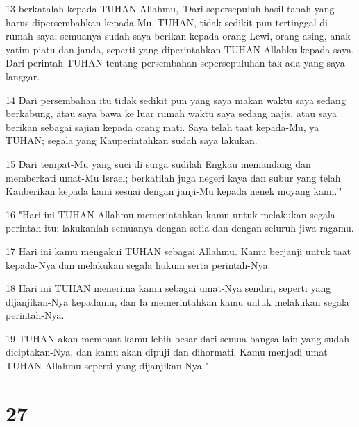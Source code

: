 \par 13 berkatalah kepada TUHAN Allahmu, 'Dari sepersepuluh hasil tanah yang harus dipersembahkan kepada-Mu, TUHAN, tidak sedikit pun tertinggal di rumah saya; semuanya sudah saya berikan kepada orang Lewi, orang asing, anak yatim piatu dan janda, seperti yang diperintahkan TUHAN Allahku kepada saya. Dari perintah TUHAN tentang persembahan sepersepuluhan tak ada yang saya langgar.
\par 14 Dari persembahan itu tidak sedikit pun yang saya makan waktu saya sedang berkabung, atau saya bawa ke luar rumah waktu saya sedang najis, atau saya berikan sebagai sajian kepada orang mati. Saya telah taat kepada-Mu, ya TUHAN; segala yang Kauperintahkan sudah saya lakukan.
\par 15 Dari tempat-Mu yang suci di surga sudilah Engkau memandang dan memberkati umat-Mu Israel; berkatilah juga negeri kaya dan subur yang telah Kauberikan kepada kami sesuai dengan janji-Mu kepada nenek moyang kami.'"
\par 16 "Hari ini TUHAN Allahmu memerintahkan kamu untuk melakukan segala perintah itu; lakukanlah semuanya dengan setia dan dengan seluruh jiwa ragamu.
\par 17 Hari ini kamu mengakui TUHAN sebagai Allahmu. Kamu berjanji untuk taat kepada-Nya dan melakukan segala hukum serta perintah-Nya.
\par 18 Hari ini TUHAN menerima kamu sebagai umat-Nya sendiri, seperti yang dijanjikan-Nya kepadamu, dan Ia memerintahkan kamu untuk melakukan segala perintah-Nya.
\par 19 TUHAN akan membuat kamu lebih besar dari semua bangsa lain yang sudah diciptakan-Nya, dan kamu akan dipuji dan dihormati. Kamu menjadi umat TUHAN Allahmu seperti yang dijanjikan-Nya."

\chapter{27}


